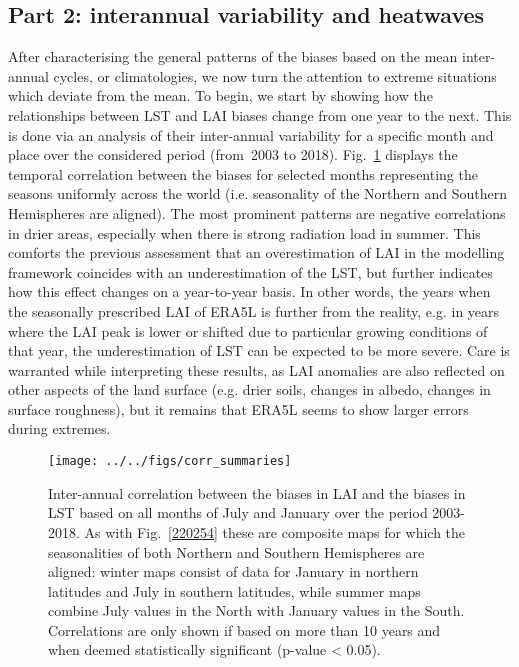 \documentclass[gmd, manuscript]{copernicus}
\begin{document}
{\par\null\par\null

\subsection*{Part 2: interannual variability and
heatwaves}

{\label{296419}}

After characterising the general patterns of the biases based on the
mean inter-annual cycles, or climatologies, we now turn the attention to
extreme situations which deviate from the mean. To begin, we start by
showing how the relationships between LST and LAI biases change from one
year to the next. This is done via an analysis of their inter-annual
variability for a specific month and place over the considered period
(from~{2003} to 2018). Fig.~{\ref{891702}} displays the
temporal correlation between the biases for selected months representing
the seasons uniformly across the world (i.e. seasonality of the Northern
and Southern Hemispheres are aligned). The most prominent patterns are
negative correlations in drier areas, especially when there is strong
radiation load in summer. This comforts the previous assessment that an
overestimation of LAI in the modelling framework coincides with an
underestimation of the LST, but further indicates how this effect
changes on a year-to-year basis. In other words, the years when the
seasonally prescribed LAI of ERA5L is further from the reality, e.g. in
years where the LAI peak is lower or shifted due to particular growing
conditions of that year, the underestimation of LST can be expected to
be more severe. Care is warranted while interpreting these results, as 
LAI anomalies are also reflected on other aspects of the land surface 
(e.g. drier soils, changes in albedo, changes in surface roughness), but 
it remains that ERA5L seems to show larger errors during extremes.

\par\null{}
\begin{figure}[H]
\begin{center}
\texttt{[image: ../../figs/corr\_summaries]}
\caption{{Inter-annual correlation between the biases in LAI and the biases in LST
based on all months of July and January over the period 2003-2018. As
with Fig.~{\ref{220254}} these are composite maps for
which the seasonalities of both Northern and Southern Hemispheres are
aligned: winter maps consist of data for January in northern latitudes
and July in southern latitudes, while summer maps combine July values in
the North with January values in the South. Correlations are only shown if based on more than 10 years and when deemed statistically significant (p-value < 0.05).
{\label{891702}}%
}}
\end{center}
\end{figure}

}
\end{document}

